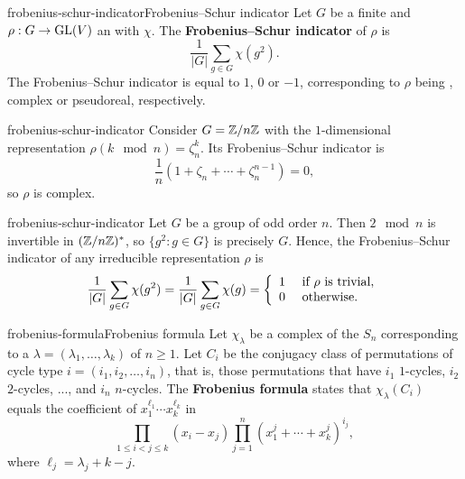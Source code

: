 

\begin{topic}{frobenius-schur-indicator}{Frobenius--Schur indicator}
    Let $G$ be a finite  and $\rho : G \to \textup{GL}(V)$ an  with  $\chi$. The \textbf{Frobenius--Schur indicator} of $\rho$ is
    \[ \frac{1}{|G|} \sum_{g \in G} \chi(g^2) . \]
    The Frobenius--Schur indicator is equal to $1$, $0$ or $-1$, corresponding to $\rho$ being , complex or pseudoreal, respectively.
\end{topic}

\begin{example}{frobenius-schur-indicator}
    Consider $G = \mathbb{Z}/n\mathbb{Z}$ with the $1$-dimensional representation $\rho(k \mod n) = \zeta_n^k$. Its Frobenius--Schur indicator is
    \[ \frac{1}{n} \left(1 + \zeta_n + \cdots + \zeta_n^{n - 1} \right) = 0 , \]
    so $\rho$ is complex.
\end{example}

\begin{example}{frobenius-schur-indicator}
    Let $G$ be a group of odd order $n$. Then $2 \mod n$ is invertible in $(\mathbb{Z}/n\mathbb{Z})^*$, so $\{ g^2 : g \in G \}$ is precisely $G$. Hence, the Frobenius--Schur indicator of any irreducible representation $\rho$ is
    \[ \frac{1}{|G|} \sum_{g \in G} \chi(g^2) = \frac{1}{|G|} \sum_{g \in G} \chi(g) = \left\{ \begin{array}{cl} 1 & \textup{ if $\rho$ is trivial} , \\ 0 & \textup{ otherwise} . \end{array} \right. \]
\end{example}

\begin{topic}{frobenius-formula}{Frobenius formula}
    Let $\chi_\lambda$ be a complex  of the  $S_n$ corresponding to a  $\lambda = (\lambda_1, \ldots, \lambda_k)$ of $n \ge 1$. Let $C_i$ be the conjugacy class of permutations of cycle type $i = (i_1, i_2, \ldots, i_n)$, that is, those permutations that have $i_1$ $1$-cycles, $i_2$ $2$-cycles, ..., and $i_n$ $n$-cycles. The \textbf{Frobenius formula} states that $\chi_\lambda(C_i)$ equals the coefficient of $x_1^{\ell_1} \cdots x_k^{\ell_k}$ in
    \[ \prod_{1 \le i < j \le k} (x_i - x_j) \prod_{j = 1}^{n} (x_1^j + \cdots + x_k^j)^{i_j} , \]
    where $\ell_j = \lambda_j + k - j$.
\end{topic}

